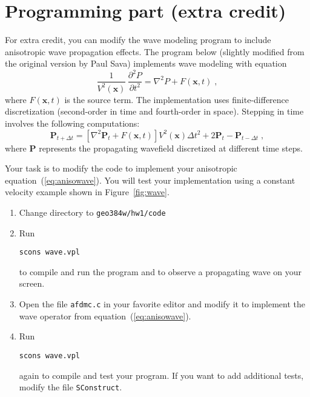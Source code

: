 \lstset{language=python,numbers=left,numberstyle=\tiny,showstringspaces=false}


\section{Programming part (extra credit)}

For extra credit, you can modify the wave modeling program to include
anisotropic wave propagation effects. The program below (slightly
modified from the original version by Paul Sava) implements wave
modeling with equation
\begin{equation}
   \label{eq:isowave2}
   {{\frac{1}{V^2(\mathbf{x})}}\,{\frac{\partial^2 P}{\partial t^2}}} =
   {\nabla^2 P} + {F(\mathbf{x},t)}\;,
\end{equation} 
where $F(\mathbf{x},t)$ is the source term. The implementation uses
finite-difference discretization (second-order in time and fourth-order in space). 
Stepping in time involves the following computations:
\begin{equation}
\mathbf{P}_{t+\Delta t} = \left[ \nabla^2 \mathbf{P}_t + F(\mathbf{x},t)\right] V^2(\mathbf{x}) \Delta t^2 + 2 \mathbf{P}_{t} - \mathbf{P}_{t-\Delta t} \;,
\label{eq:step}
\end{equation}
where $\mathbf{P}$ represents the propagating wavefield discretized at different time steps.

\lstset{language=c,numbers=left,numberstyle=\tiny,showstringspaces=false}


Your task is to modify the code to implement your anisotropic
equation~(\ref{eq:anisowave}). You will test your implementation using a constant velocity example shown in Figure~\ref{fig:wave}.


\begin{enumerate}
\item Change directory to \verb#geo384w/hw1/code#
\item Run
\begin{verbatim}
scons wave.vpl
\end{verbatim}
to compile and run the program and to observe a propagating wave on your screen.
\item Open the file \texttt{afdmc.c} in your favorite editor and modify it to implement the wave operator from equation~(\ref{eq:anisowave}).
\item Run
\begin{verbatim}
scons wave.vpl
\end{verbatim}
again to compile and test your program. If you want to add additional tests, modify the file \texttt{SConstruct}.
\end{enumerate}

